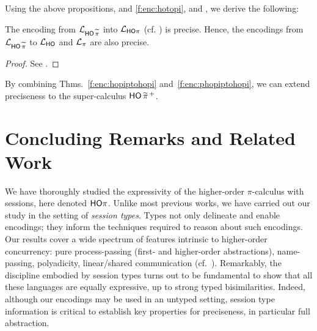 \documentclass[runningheads]{llncs}
\begin{document}
{{%
Using the above propositions,  
and 
\ref{f:enc:hotopi},
and , 
we derive the following: 
\begin{theorem}
	\label{f:enc:phopiptohopi}
	The encoding from
		$\mathcal{L}_{\mathsf{HO}\,{\widetilde{\pi}}}$ into $\mathcal{L}_{\mathsf{HO}\pi}$ (cf. )
	is precise. 
	Hence, the encodings 
	from
	$\mathcal{L}_{\mathsf{HO}\,{\widetilde{\pi}}}$ to $\mathcal{L}_{\mathsf{HO}}$ 
	and $\mathcal{L}_{\pi}$ 
	are also precise. 
\end{theorem}

\begin{proof}
See .
\end{proof}


By combining Thms.~\ref{f:enc:hopiptohopi} and~\ref{f:enc:phopiptohopi},
we can extend preciseness to the super-calculus
$\mathsf{HO}\,{\widetilde{\pi}}^{\,+}$.







\section{Concluding Remarks and Related Work}
\label{sec:relwork}
%

We have thoroughly studied the expressivity of the higher-order $\pi$-calculus with sessions,
here denoted $\mathsf{HO}\pi$.
Unlike most previous works, 
we have carried out our study in the setting of \emph{session types}. %
Types not only delineate and enable encodings; they 
inform the techniques required to reason about such encodings.
Our results cover a wide spectrum of features intrinsic to higher-order concurrency:
pure process-passing (first- and higher-order abstractions), name-passing, polyadicity, 
linear/shared communication (cf.~). 
Remarkably, the discipline embodied by 
session types turns out to be fundamental to show that all these languages are equally expressive, up to 
 strong typed bisimilarities. Indeed, although our encodings may be used in an untyped setting,
session type information is critical to establish key properties for preciseness, in particular full abstraction.

}}
\end{document}
